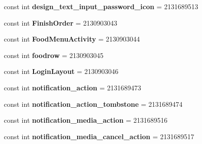 \begin{DoxyCompactItemize}
const int {\bfseries design\+\_\+text\+\_\+input\+\_\+password\+\_\+icon} = 2131689513
\item 
\mbox{\label{classst_delivery_1_1_resource_1_1_layout_a0892a2550afb48131807d995d5404bf8}} 
const int {\bfseries Finish\+Order} = 2130903043
\item 
\mbox{\label{classst_delivery_1_1_resource_1_1_layout_a7393145a6faafb9fe739c43e70511541}} 
const int {\bfseries Food\+Menu\+Activity} = 2130903044
\item 
\mbox{\label{classst_delivery_1_1_resource_1_1_layout_ac2df7361e9a0372cabf1aa607bb1079e}} 
const int {\bfseries foodrow} = 2130903045
\item 
\mbox{\label{classst_delivery_1_1_resource_1_1_layout_ac3850fb7b813028c9d0c96732d8c75cc}} 
const int {\bfseries Login\+Layout} = 2130903046
\item 
\mbox{\label{classst_delivery_1_1_resource_1_1_layout_a2e62822b03cfd137c6303374239a8385}} 
const int {\bfseries notification\+\_\+action} = 2131689473
\item 
\mbox{\label{classst_delivery_1_1_resource_1_1_layout_ac3e50ca481d680a9d9daf4a15edb3e8d}} 
const int {\bfseries notification\+\_\+action\+\_\+tombstone} = 2131689474
\item 
\mbox{\label{classst_delivery_1_1_resource_1_1_layout_a6bcf74efde07b86d364d55063e069a04}} 
const int {\bfseries notification\+\_\+media\+\_\+action} = 2131689516
\item 
\mbox{\label{classst_delivery_1_1_resource_1_1_layout_ad658932d97b0b168c89c0b344536b776}} 
const int {\bfseries notification\+\_\+media\+\_\+cancel\+\_\+action} = 2131689517
\item 
\mbox{\label{classst_delivery_1_1_resource_1_1_layout_a1ed8e7ff2387fc0253d2bd3931d8d8fa}} 

\end{DoxyCompactItemize}
